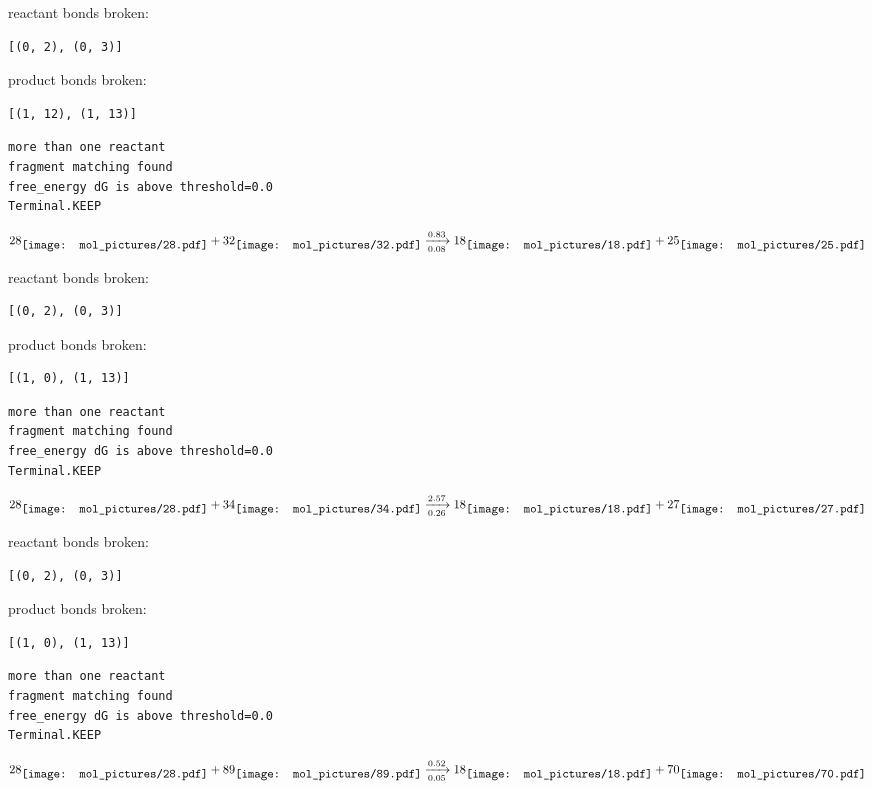 \documentclass{article}
\begin{document}
reactant bonds broken:\begin{verbatim}
[(0, 2), (0, 3)]
\end{verbatim}
product bonds broken:\begin{verbatim}
[(1, 12), (1, 13)]
\end{verbatim}




\vspace{1cm}
\begin{verbatim}
more than one reactant
fragment matching found
free_energy dG is above threshold=0.0
Terminal.KEEP
\end{verbatim}
$$
28
\raisebox{-.5\height}{\texttt{[image: mol\_pictures/28.pdf]}}
+
32
\raisebox{-.5\height}{\texttt{[image: mol\_pictures/32.pdf]}}
\xrightarrow[0.08]{0.83}
18
\raisebox{-.5\height}{\texttt{[image: mol\_pictures/18.pdf]}}
+
25
\raisebox{-.5\height}{\texttt{[image: mol\_pictures/25.pdf]}}
$$


reactant bonds broken:\begin{verbatim}
[(0, 2), (0, 3)]
\end{verbatim}
product bonds broken:\begin{verbatim}
[(1, 0), (1, 13)]
\end{verbatim}




\vspace{1cm}
\begin{verbatim}
more than one reactant
fragment matching found
free_energy dG is above threshold=0.0
Terminal.KEEP
\end{verbatim}
$$
28
\raisebox{-.5\height}{\texttt{[image: mol\_pictures/28.pdf]}}
+
34
\raisebox{-.5\height}{\texttt{[image: mol\_pictures/34.pdf]}}
\xrightarrow[0.26]{2.57}
18
\raisebox{-.5\height}{\texttt{[image: mol\_pictures/18.pdf]}}
+
27
\raisebox{-.5\height}{\texttt{[image: mol\_pictures/27.pdf]}}
$$


reactant bonds broken:\begin{verbatim}
[(0, 2), (0, 3)]
\end{verbatim}
product bonds broken:\begin{verbatim}
[(1, 0), (1, 13)]
\end{verbatim}




\vspace{1cm}
\begin{verbatim}
more than one reactant
fragment matching found
free_energy dG is above threshold=0.0
Terminal.KEEP
\end{verbatim}
$$
28
\raisebox{-.5\height}{\texttt{[image: mol\_pictures/28.pdf]}}
+
89
\raisebox{-.5\height}{\texttt{[image: mol\_pictures/89.pdf]}}
\xrightarrow[0.05]{0.52}
18
\raisebox{-.5\height}{\texttt{[image: mol\_pictures/18.pdf]}}
+
70
\raisebox{-.5\height}{\texttt{[image: mol\_pictures/70.pdf]}}
$$
\end{document}
